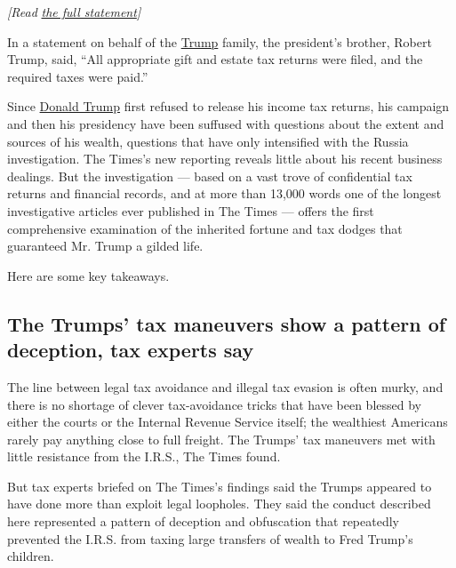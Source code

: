 \emph{{[}Read}
\href{https://int.graylady3jvrrxbe.onion/data/documenthelper/353-trump-inheritance-taxes-statement/2986a100d3d19a917cdc/optimized/full.pdf\#page=1?action=click\&module=Intentional\&pgtype=Article}{\emph{the
full statement}}\emph{{]}}

In a statement on behalf of the
\href{https://www.nytimes3xbfgragh.onion/interactive/2019/05/07/us/politics/donald-trump-taxes.html}{Trump}
family, the president's brother, Robert Trump, said, ``All appropriate
gift and estate tax returns were filed, and the required taxes were
paid.''

Since
\href{https://www.nytimes3xbfgragh.onion/interactive/2018/10/02/us/politics/donald-trump-tax-schemes-fred-trump.html}{Donald
Trump} first refused to release his income tax returns, his campaign and
then his presidency have been suffused with questions about the extent
and sources of his wealth, questions that have only intensified with the
Russia investigation. The Times's new reporting reveals little about his
recent business dealings. But the investigation --- based on a vast
trove of confidential tax returns and financial records, and at more
than 13,000 words one of the longest investigative articles ever
published in The Times --- offers the first comprehensive examination of
the inherited fortune and tax dodges that guaranteed Mr. Trump a gilded
life.

Here are some key takeaways.

\hypertarget{the-trumps-tax-maneuvers-show-a-pattern-of-deception-tax-experts-say}{%
\subsection{The Trumps' tax maneuvers show a pattern of deception, tax
experts
say}\label{the-trumps-tax-maneuvers-show-a-pattern-of-deception-tax-experts-say}}

The line between legal tax avoidance and illegal tax evasion is often
murky, and there is no shortage of clever tax-avoidance tricks that have
been blessed by either the courts or the Internal Revenue Service
itself; the wealthiest Americans rarely pay anything close to full
freight. The Trumps' tax maneuvers met with little resistance from the
I.R.S., The Times found.

But tax experts briefed on The Times's findings said the Trumps appeared
to have done more than exploit legal loopholes. They said the conduct
described here represented a pattern of deception and obfuscation that
repeatedly prevented the I.R.S. from taxing large transfers of wealth to
Fred Trump's children.

